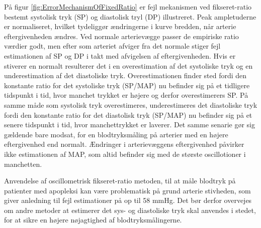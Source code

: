 \begin{minipage}[t]{0.5\textwidth}
På figur \ref{fig:ErrorMechanismOfFixedRatio} er fejl mekanismen ved fikseret-ratio bestemt systolisk tryk (SP) og diastolisk tryl (DP) illustreret. Peak ampletuderne er normaliseret, hvilket tydeliggør ændringerne i kurve bredden, når arterie eftergivenheden ændres. Ved normale arterievægge passer de empiriske ratio værdier godt, men efter som arteriet afviger fra det normale stiger fejl estimationen af SP og DP i takt med afvigelsen af eftergivenheden. Hvis er stiverer en normalt resulterer det i en overestimation af det systoliske tryk og en underestimation af det diastoliske tryk. Overestimationen finder sted fordi den konstante ratio for det systoliske tryk (SP/MAP) nu befinder sig på et tidligere tidspunkt i tid, hvor manchet trykket er højere og derfor overestimerers SP. På samme måde som systolisk tryk overestimeres, underestimeres det diastoliske tryk fordi den konstante ratio for det diastolisk tryk (SP/MAP) nu befinder sig på et senere tidspunkt i tid, hvor manchettrykket er laverer. Det samme senarie gør sig gældende bare modsat, for en blodtryksmåling på arterier med en højere eftergivenhed end normalt. Ændringer i arterievæggens eftergivenhed påvirker ikke estimationen af MAP, som altid befinder sig med de største oscillotioner i manchetten.

Anvendelse af oscillometrisk fikseret-ratio metoden, til at måle blodtryk på patienter med apopleksi kan være problematisk på grund arterie stivheden, som giver anledning til fejl estimationer på op til 58 mmHg. Det bør derfor overvejes om andre metoder at estimerer det sys- og diastoliske tryk skal anvendes i stedet, for at sikre en højere nøjagtighed af blodtryksmålingerne.
\end{minipage}
